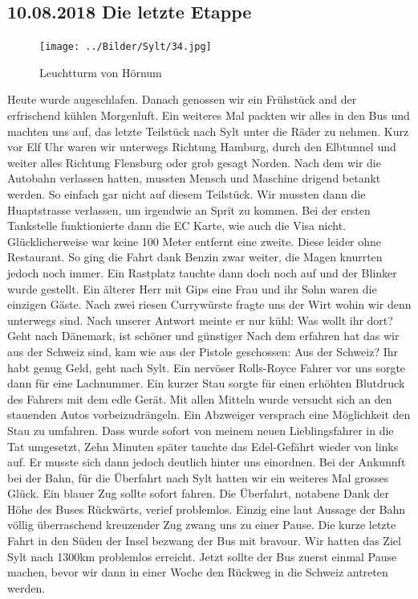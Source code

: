 \subsection{10.08.2018 Die letzte Etappe}

\begin{figure} 
  \begin{centering}
    \texttt{[image: ../Bilder/Sylt/34.jpg]}
    \caption{Leuchtturm von Hörnum}
  \end{centering}
\end{figure} 

Heute wurde augeschlafen.
Danach genossen wir ein Frühstück and der erfrischend kühlen Morgenluft.
Ein weiteres Mal packten wir alles in den Bus und machten uns auf, das letzte Teilstück nach Sylt unter die Räder zu nehmen.
Kurz vor Elf Uhr waren wir unterwegs Richtung Hamburg, durch den Elbtunnel und weiter alles Richtung Flensburg oder grob gesagt Norden.
Nach dem wir die Autobahn verlassen hatten, mussten Mensch und Maschine drigend betankt werden.
So einfach gar nicht auf diesem Teilstück.
Wir mussten dann die Huaptstrasse verlassen, um irgendwie an Sprit zu kommen.
Bei der ersten Tankstelle funktionierte dann die EC Karte, wie auch die Visa nicht.
Glücklicherweise war keine 100 Meter entfernt eine zweite.
Diese leider ohne Restaurant.
So ging die Fahrt dank Benzin zwar weiter, die Magen knurrten jedoch noch immer.
Ein Rastplatz tauchte dann doch noch auf und der Blinker wurde gestellt.
Ein älterer Herr mit Gips eine Frau und ihr Sohn waren die einzigen Gäste.
Nach zwei riesen Currywürste fragte uns der \glqq Wirt\grqq{} wohin wir denn unterwegs sind.
Nach unserer Antwort meinte er nur kühl: \glqq Was wollt ihr dort? Geht nach Dänemark, ist schöner und günstiger\grqq{}
Nach dem erfahren hat das wir aus der Schweiz sind, kam wie aus der Pistole geschossen: \glqq Aus der Schweiz? Ihr habt genug Geld, geht nach Sylt.\grqq{}
Ein nervöser Rolls-Royce Fahrer vor uns sorgte dann für eine Lachnummer.
Ein kurzer Stau sorgte für einen erhöhten Blutdruck des Fahrers mit dem edle Gerät.
Mit allen Mitteln wurde versucht sich an den stauenden Autos vorbeizudrängeln. 
Ein Abzweiger versprach eine Möglichkeit den Stau zu umfahren.
Dass wurde sofort von meinem neuen Lieblingsfahrer in die Tat umgesetzt,
Zehn Minuten später tauchte das Edel-Gefährt wieder von links auf. 
Er musste sich dann jedoch deutlich hinter uns einordnen.
Bei der Ankunnft bei der Bahn, für die Überfahrt nach Sylt hatten wir ein weiteres Mal grosses Glück.
Ein blauer Zug sollte sofort fahren.
Die Überfahrt, notabene Dank der Höhe des Buses Rückwärts, verief problemlos.
Einzig eine laut Aussage der Bahn völlig überraschend kreuzender Zug zwang uns zu einer Pause.
Die kurze letzte Fahrt in den Süden der Insel bezwang der Bus mit bravour.
Wir hatten das Ziel Sylt nach 1300km problemlos erreicht.
Jetzt sollte der Bus zuerst einmal Pause machen, bevor wir dann in einer Woche den Rückweg in die Schweiz antreten werden.

